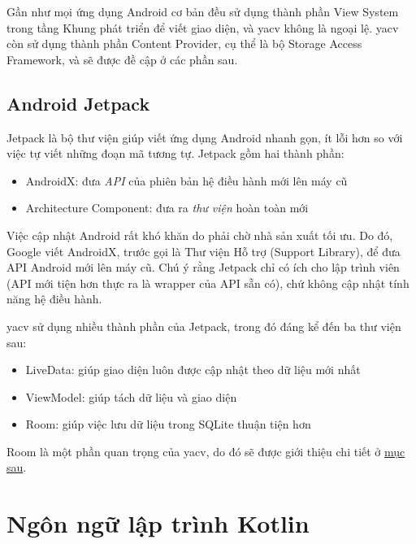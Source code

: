 \documentclass[../../thesis]{subfiles}
\begin{document}
Gần như mọi ứng dụng Android cơ bản đều sử dụng thành phần View System trong
tầng Khung phát triển để viết giao diện, và yacv không là ngoại lệ. yacv còn sử
dụng thành phần Content Provider, cụ thể là bộ Storage Access Framework, và sẽ
được đề cập ở các phần sau.

\subsection{Android Jetpack}

Jetpack là bộ thư viện giúp viết ứng dụng Android nhanh gọn, ít lỗi hơn so với
việc tự viết những đoạn mã tương tự. Jetpack gồm hai thành phần:

\begin{itemize}
    \item
        AndroidX: đưa \emph{API} của phiên bản hệ điều hành mới lên máy cũ
    \item
        Architecture Component: đưa ra \emph{thư viện} hoàn toàn mới
\end{itemize}

Việc cập nhật Android rất khó khăn do phải chờ nhà sản xuất tối ưu. Do đó,
Google viết AndroidX, trước gọi là Thư viện Hỗ trợ (Support Library), để đưa API
Android mới lên máy cũ. Chú ý rằng Jetpack chỉ có ích cho lập trình viên (API
mới tiện hơn thực ra là wrapper của API sẵn có), chứ không cập nhật tính năng hệ
điều hành.

yacv sử dụng nhiều thành phần của Jetpack, trong đó đáng kể đến ba thư viện sau:

\begin{itemize}
    \item
        LiveData: giúp giao diện luôn được cập nhật theo dữ liệu mới nhất
    \item
        ViewModel: giúp tách dữ liệu và giao diện
    \item
        Room: giúp việc lưu dữ liệu trong SQLite thuận tiện hơn
\end{itemize}

Room là một phần quan trọng của yacv, do đó sẽ được giới thiệu chi tiết ở
\protect\hyperlink{P2.4.2-room}{mục sau}.



\section{Ngôn ngữ lập trình Kotlin}
\end{document}
